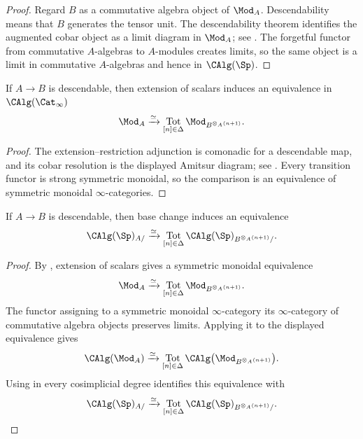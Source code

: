 \begin{proof}
Regard $B$ as a commutative algebra object of $\Mod_A$. Descendability
means that $B$ generates the tensor unit. The descendability theorem
identifies the augmented cobar object as a limit diagram in $\Mod_A$; see
\cite[Proposition~3.20]{MathewGaloisStableHomotopy}. The forgetful functor
from commutative $A$-algebras to $A$-modules creates limits, so the same
object is a limit in commutative $A$-algebras and hence in
$\CAlg(\Sp)$.
\end{proof}

\begin{theorem}
\label{thm:spectral-affine-module-descent}
If $A\to B$ is descendable, then extension of scalars induces an
equivalence in $\CAlg(\Cat_\infty)$
\[
    \Mod_A
    \xrightarrow{\simeq}
    \operatorname*{Tot}_{[n]\in\Delta}
    \Mod_{B^{\otimes_A(n+1)}}.
\]
\end{theorem}

\begin{proof}
The extension--restriction adjunction is comonadic for a descendable map,
and its cobar resolution is the displayed Amitsur diagram; see
\cite[Proposition~3.22]{MathewGaloisStableHomotopy}. Every transition
functor is strong symmetric monoidal, so the comparison is an equivalence
of symmetric monoidal $\infty$-categories.
\end{proof}

\begin{theorem}
\label{thm:spectral-affine-algebra-descent}
If $A\to B$ is descendable, then base change induces an equivalence
\[
    \CAlg(\Sp)_{A/}
    \xrightarrow{\simeq}
    \operatorname*{Tot}_{[n]\in\Delta}
    \CAlg(\Sp)_{B^{\otimes_A(n+1)}/}.
\]
\end{theorem}

\begin{proof}
By , extension of scalars gives a
symmetric monoidal equivalence
\[
    \Mod_A
    \xrightarrow{\simeq}
    \operatorname*{Tot}_{[n]\in\Delta}
    \Mod_{B^{\otimes_A(n+1)}}.
\]
The functor assigning to a symmetric monoidal $\infty$-category its
$\infty$-category of commutative algebra objects preserves limits.
Applying it to the displayed equivalence gives
\[
    \CAlg(\Mod_A)
    \xrightarrow{\simeq}
    \operatorname*{Tot}_{[n]\in\Delta}
    \CAlg
    \bigl(
        \Mod_{B^{\otimes_A(n+1)}}
    \bigr).
\]
Using
 in every cosimplicial
degree identifies this equivalence with
\[
    \CAlg(\Sp)_{A/}
    \xrightarrow{\simeq}
    \operatorname*{Tot}_{[n]\in\Delta}
    \CAlg(\Sp)_{B^{\otimes_A(n+1)}/}.
\]
\end{proof}

